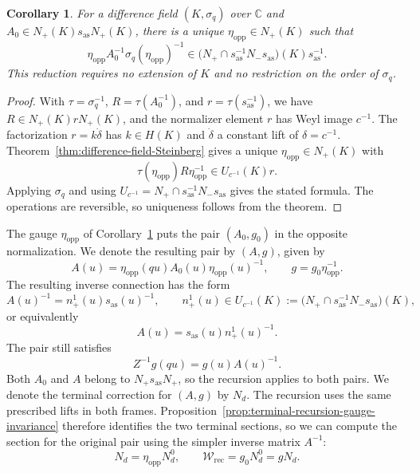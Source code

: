 \documentclass[11pt,leqno]{amsart}
\numberwithin{equation}{section}
\theoremstyle{plain}
\newtheorem{corollary}[theorem]{Corollary}
\theoremstyle{definition}
\theoremstyle{plain}
\theoremstyle{definition}
\theoremstyle{remark}
\begin{document}
\begin{corollary}\label{lem:opposite-reduction-over-field}
For a difference field $(K,\sigma_q)$ over $\mathbb C$ and $A_0\in N_+(K)s_{\mathrm{as}}N_+(K)$, there is a unique $\eta_{\mathrm{opp}}\in N_+(K)$ such that
\[
 \eta_{\mathrm{opp}}A_0^{-1}\sigma_q(\eta_{\mathrm{opp}})^{-1}
 \in\bigl(N_+\cap s_{\mathrm{as}}^{-1}N_-s_{\mathrm{as}}\bigr)(K)
       s_{\mathrm{as}}^{-1}.
\]
This reduction requires no extension of $K$ and no restriction on the order of $\sigma_q$.
\end{corollary}
\begin{proof}
With $\tau=\sigma_q^{-1}$, $R=\tau(A_0^{-1})$, and $r=\tau(s_{\mathrm{as}}^{-1})$, we have $R\in N_+(K)rN_+(K)$, and the normalizer element $r$ has Weyl image $c^{-1}$.  The factorization $r=k\dot\delta$ has $k\in H(K)$ and $\dot\delta$ a constant lift of $\delta=c^{-1}$.  Theorem~\ref{thm:difference-field-Steinberg} gives a unique $\eta_{\mathrm{opp}}\in N_+(K)$ with
\[
 \tau(\eta_{\mathrm{opp}})R\eta_{\mathrm{opp}}^{-1}
 \in U_{c^{-1}}(K)r.
\]
Applying $\sigma_q$ and using $U_{c^{-1}}=N_+\cap s_{\mathrm{as}}^{-1}N_-s_{\mathrm{as}}$ gives the stated formula.  The operations are reversible, so uniqueness follows from the theorem.
\end{proof}

The gauge $\eta_{\mathrm{opp}}$ of Corollary~\ref{lem:opposite-reduction-over-field} puts the pair $(A_0,g_0)$ in the opposite normalization.  We denote the resulting pair by $(A,g)$, given by
\begin{equation}\label{eq:opposite-normal-form-gauge}
 A(u)
   =\eta_{\mathrm{opp}}(qu)A_0(u)\eta_{\mathrm{opp}}(u)^{-1},
 \qquad
 g=g_0\eta_{\mathrm{opp}}^{-1}.
\end{equation}
The resulting inverse connection has the form
\begin{equation}\label{eq:Bopp-inverse-form}
 A(u)^{-1}=n_+^1(u)s_{\mathrm{as}}(u)^{-1},
 \qquad
 n_+^1(u)\in U_{c^{-1}}(K)
 :=\bigl(N_+\cap s_{\mathrm{as}}^{-1}N_-s_{\mathrm{as}}\bigr)(K),
\end{equation}
or equivalently
\begin{equation}\label{eq:DS-connection}
 A(u)=s_{\mathrm{as}}(u)n_+^1(u)^{-1}.
\end{equation}
The pair still satisfies
\begin{equation}\label{eq:canonical-gauge-identity}
 Z^{-1}g(qu)
 =g(u)A(u)^{-1}.
\end{equation}
Both $A_0$ and $A$ belong to $N_+s_{\mathrm{as}}N_+$, so the recursion applies to both pairs.  We denote the terminal correction for $(A,g)$ by $N_d$.  The recursion uses the same prescribed lifts in both frames.  Proposition~\ref{prop:terminal-recursion-gauge-invariance} therefore identifies the two terminal sections, so we can compute the section for the original pair using the simpler inverse matrix $A^{-1}$:
\begin{equation}\label{eq:canonical-terminal-factor-law}
 N_d=\eta_{\mathrm{opp}}N_d^0,
 \qquad
 \mathscr W_{\mathrm{rec}}
 =g_0N_d^0=gN_d.
\end{equation}
\end{document}
